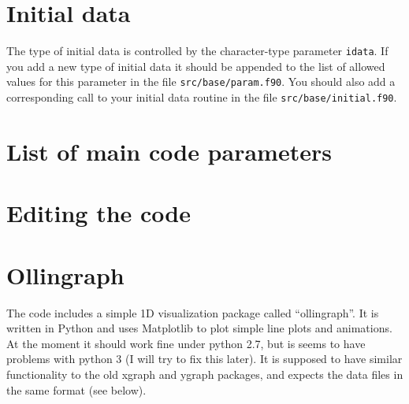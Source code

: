 \documentclass[12pt]{article}
\begin{document}



\setcounter{equation}{0}
\section{Initial data}
\label{sec:initial}

The type of initial data is controlled by the character-type parameter
\texttt{idata}.  If you add a new type of initial data it should be
appended to the list of allowed values for this parameter in the file
\texttt{src/base/param.f90}.  You should also add a corresponding call to your
initial data routine in the file \texttt{src/base/initial.f90}. \\









\section{List of main code parameters}
\label{sec:parameters}



\section{Editing the code}
\label{sec:editing}



\section{Ollingraph}
\label{sec:ollingraph}

The code includes a simple 1D visualization package called
``ollingraph''.  It is written in Python and uses Matplotlib to plot
simple line plots and animations.  At the moment it should work fine
under python 2.7, but is seems to have problems with python 3 (I will
try to fix this later). It is supposed to have similar functionality to
the old xgraph and ygraph packages, and expects the data files in the
same format (see below). \\
\end{document}
